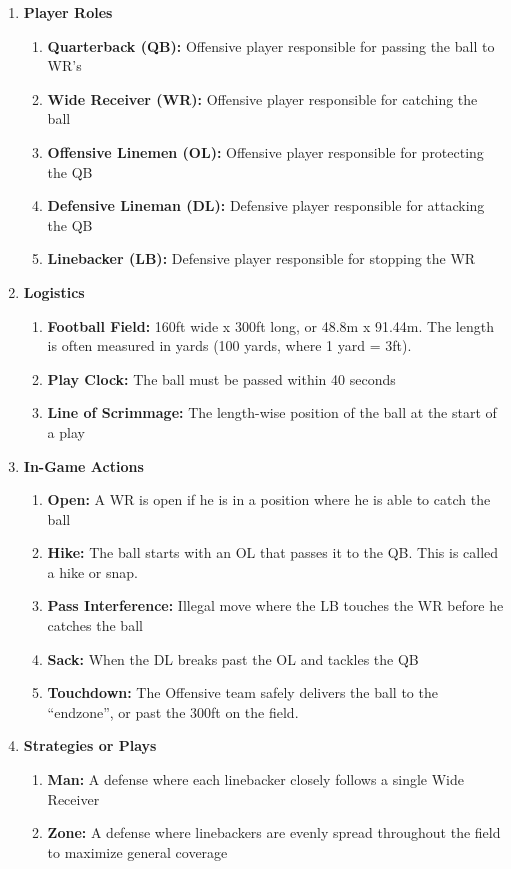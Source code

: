 \begin{enumerate}
    \item \textbf{Player Roles}
        \begin{enumerate}
            \item \textbf{Quarterback (QB):} Offensive player responsible for passing the ball to WR’s
            \item \textbf{Wide Receiver (WR):} Offensive player responsible for catching the ball 
            \item \textbf{Offensive Linemen (OL):} Offensive player responsible for protecting the QB 
            \item \textbf{Defensive Lineman (DL):} Defensive player responsible for attacking the QB
            \item \textbf{Linebacker (LB):} Defensive player responsible for stopping the WR
        \end{enumerate}
    \newpage
    \item \textbf{Logistics}
        \begin{enumerate}
            \item \textbf{Football Field:} 160ft wide x 300ft long, or 48.8m x 91.44m. The length is often measured in yards (100 yards, where 1 yard = 3ft). 
            \item \textbf{Play Clock:} The ball must be passed within 40 seconds
            \item \textbf{Line of Scrimmage:} The length-wise position of the ball at the start of a play
        \end{enumerate}
    \item \textbf{In-Game Actions}
        \begin{enumerate}
            \item \textbf{Open:} A WR is open if he is in a position where he is able to catch the ball
            \item \textbf{Hike:} The ball starts with an OL that passes it to the QB. This is called a hike or snap.
            \item \textbf{Pass Interference:} Illegal move where the LB touches the WR before he catches the ball 
            \item \textbf{Sack:} When the DL breaks past the OL and tackles the QB
            \item \textbf{Touchdown:} The Offensive team safely delivers the ball to the “endzone”, or past the 300ft on the field.
        \end{enumerate}
    \item \textbf{Strategies or Plays}
        \begin{enumerate}
            \item \textbf{Man:} A defense where each linebacker closely follows a single Wide Receiver
            \item \textbf{Zone:} A defense where linebackers are evenly spread throughout the field to maximize general coverage
        \end{enumerate}
\end{enumerate}

